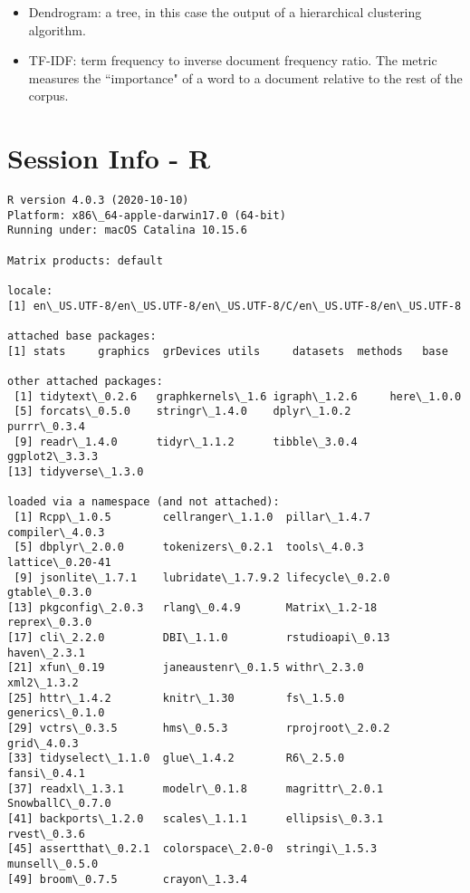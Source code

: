 \begin{appendices}
\begin{itemize}
\item{Dendrogram: a tree, in this case the output of a hierarchical clustering algorithm.}

\item{TF-IDF: term frequency to inverse document frequency ratio. The metric measures the ``importance" of a word to a document relative to the rest of the corpus.}


\end{itemize}


\chapter{Session Info - R}
\begin{lstlisting}
R version 4.0.3 (2020-10-10)
Platform: x86\_64-apple-darwin17.0 (64-bit)
Running under: macOS Catalina 10.15.6

Matrix products: default

locale:
[1] en\_US.UTF-8/en\_US.UTF-8/en\_US.UTF-8/C/en\_US.UTF-8/en\_US.UTF-8

attached base packages:
[1] stats     graphics  grDevices utils     datasets  methods   base     

other attached packages:
 [1] tidytext\_0.2.6   graphkernels\_1.6 igraph\_1.2.6     here\_1.0.0      
 [5] forcats\_0.5.0    stringr\_1.4.0    dplyr\_1.0.2      purrr\_0.3.4     
 [9] readr\_1.4.0      tidyr\_1.1.2      tibble\_3.0.4     ggplot2\_3.3.3   
[13] tidyverse\_1.3.0 

loaded via a namespace (and not attached):
 [1] Rcpp\_1.0.5        cellranger\_1.1.0  pillar\_1.4.7      compiler\_4.0.3   
 [5] dbplyr\_2.0.0      tokenizers\_0.2.1  tools\_4.0.3       lattice\_0.20-41  
 [9] jsonlite\_1.7.1    lubridate\_1.7.9.2 lifecycle\_0.2.0   gtable\_0.3.0     
[13] pkgconfig\_2.0.3   rlang\_0.4.9       Matrix\_1.2-18     reprex\_0.3.0     
[17] cli\_2.2.0         DBI\_1.1.0         rstudioapi\_0.13   haven\_2.3.1      
[21] xfun\_0.19         janeaustenr\_0.1.5 withr\_2.3.0       xml2\_1.3.2       
[25] httr\_1.4.2        knitr\_1.30        fs\_1.5.0          generics\_0.1.0   
[29] vctrs\_0.3.5       hms\_0.5.3         rprojroot\_2.0.2   grid\_4.0.3       
[33] tidyselect\_1.1.0  glue\_1.4.2        R6\_2.5.0          fansi\_0.4.1      
[37] readxl\_1.3.1      modelr\_0.1.8      magrittr\_2.0.1    SnowballC\_0.7.0  
[41] backports\_1.2.0   scales\_1.1.1      ellipsis\_0.3.1    rvest\_0.3.6      
[45] assertthat\_0.2.1  colorspace\_2.0-0  stringi\_1.5.3     munsell\_0.5.0    
[49] broom\_0.7.5       crayon\_1.3.4


\end{lstlisting}
\end{appendices}
